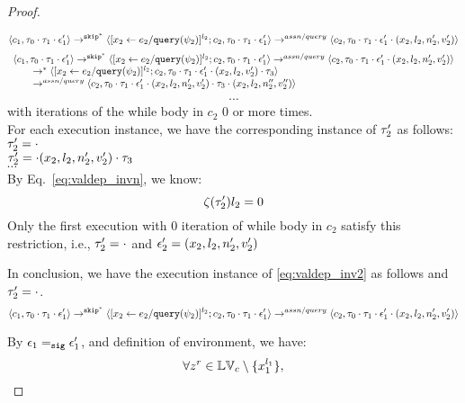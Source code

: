 {\begin{proof}
\begin{subproof}
\begin{enumerate}
  \[
  \langle c_1, \mathtt{\tau}_0 \cdot \mathtt{\tau}_1 \cdot \mathtt{\epsilon}_1' \rangle 
  \rightarrow^{\mathtt{skip}^*} 
  \langle [\mathrel{ {x}_2 \leftarrow e_2 / {\tt query}(\psi_2) }]^{l_2} ; {c}_2, \mathtt{\tau}_0 \cdot \mathtt{\tau}_1 \cdot \mathtt{\epsilon}_1' \rangle 
  \rightarrow^{assn/query} 
  \langle {c}_2,  \mathtt{\tau}_0 \cdot \mathtt{\tau}_1 \cdot \mathtt{\epsilon}_1' \cdot (x_2, l_2, n_2', v_2') \rangle 
 \]
%
  \[
  \begin{array}{l}
  \langle c_1, \mathtt{\tau}_0 \cdot \mathtt{\tau}_1 \cdot \mathtt{\epsilon}_1' \rangle 
  \rightarrow^{\mathtt{skip}^*} 
  \langle [\mathrel{ {x}_2 \leftarrow e_2 / {\tt query}(\psi_2) }]^{l_2} ; {c}_2, \mathtt{\tau}_0 \cdot \mathtt{\tau}_1 \cdot \mathtt{\epsilon}_1' \rangle 
  \rightarrow^{assn/query} 
  \langle {c}_2,  \mathtt{\tau}_0 \cdot \mathtt{\tau}_1 \cdot \mathtt{\epsilon}_1' \cdot (x_2, l_2, n_2', v_2') \rangle 
  \\ \qquad
  \rightarrow^{*} 
  \langle [\mathrel{ {x}_2 \leftarrow e_2 / {\tt query}(\psi_2) }]^{l_2} ; {c}_2, 
  \mathtt{\tau}_0 \cdot \mathtt{\tau}_1 \cdot \mathtt{\epsilon}_1' \cdot (x_2, l_2, v_2') \cdot \mathtt{\tau}_3 \rangle 
  \\ \qquad
  \rightarrow^{assn/query} 
  \langle {c}_2,  \mathtt{\tau}_0 \cdot \mathtt{\tau}_1 \cdot \mathtt{\epsilon}_1' \cdot (x_2, l_2, n_2', v_2') \cdot \mathtt{\tau}_3 \cdot (x_2, l_2, n_2'', v_2'') \rangle 
 \end{array}
 \]
\[
  \cdots
\] 
with iterations of the while body in $c_2$ $0$ or more times.
%
\\
%
For each execution instance, we have the corresponding instance of $\mathtt{\tau}_2'$ as follows:
\\
  $\mathtt{\tau}_2'  = \cdot$
\\
$\mathtt{\tau}_2' = \cdot (x_2, l_2, n_2', v_2') \cdot \mathtt{\tau}_3 $
%
\\
$\cdots$
%
\\
%
By Eq.~\ref{eq:valdep_invn}, we know:
%
\[
 \mathtt{\zeta}(\mathtt{\tau}_2') l_2 = 0
\]
%
Only the first execution with 0 iteration of while body in $c_2$ satisfy this restriction, i.e., $\mathtt{\tau}_2' = \cdot$ and $\mathtt{\epsilon}_2' = (x_2, l_2, n_2', v_2')$
%
\end{enumerate}
In conclusion, we have the execution instance of \ref{eq:valdep_inv2}  as follows and $\mathtt{\tau}_2' = \cdot$.
  \[
  \langle c_1, \mathtt{\tau}_0 \cdot \mathtt{\tau}_1 \cdot \mathtt{\epsilon}_1' \rangle 
  \rightarrow^{\mathtt{skip}^*} 
  \langle [\mathrel{ {x}_2 \leftarrow e_2 / {\tt query}(\psi_2) }]^{l_2} ; {c}_2, \mathtt{\tau}_0 \cdot \mathtt{\tau}_1 \cdot \mathtt{\epsilon}_1' \rangle 
  \rightarrow^{assn/query} 
  \langle {c}_2,  \mathtt{\tau}_0 \cdot \mathtt{\tau}_1 \cdot \mathtt{\epsilon}_1' \cdot (x_2, l_2, n_2', v_2') \rangle 
 \]
\end{subproof}
%
By $\mathtt{\epsilon}_1 =_{\mathtt{sig}} \mathtt{\epsilon}_1'$, and definition of environment, we have:
\[
  \forall z^r \in \mathbb{LV}_c \setminus \{x_1^{l_1}\} ,
\]
\end{proof}}
